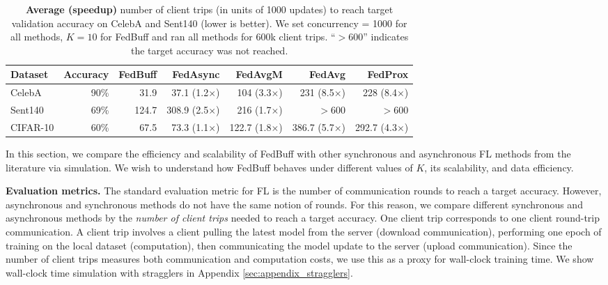 \documentclass[twoside]{article}
\newcommand{\algname}{{FedBuff}\xspace}
\begin{document}
\begin{table}
\centering
\caption{\textbf{Average (speedup)} number of client trips (in units of 1000 updates) to reach target validation accuracy on CelebA and Sent140 (lower is better). We set concurrency = 1000 for all methods, $K=10$ for FedBuff and ran all methods for 600k client trips. ``$>600$'' indicates the target accuracy was not reached.}
\label{tab:baseline_convergence}
\begin{tabular}{lrrrrrr} 
\toprule
Dataset &  Accuracy &   FedBuff    & FedAsync       & FedAvgM    & FedAvg     & FedProx     \\ 
\midrule
CelebA  & 90\%              & 31.9  & 37.1 (1.2$\times$)    & 104 (3.3$\times$) & 231 (8.5$\times$) & 228 (8.4$\times$)  \\
Sent140 & 69\%             & 124.7 & 308.9 (2.5$\times$) & 216 (1.7$\times$) & $>600$   & $ >600$    \\
CIFAR-10 & 60\%             & 67.5 & 73.3 (1.1$\times$) & 122.7 (1.8$\times$) & 386.7 (5.7$\times$) &  292.7 (4.3$\times$)    \\
\bottomrule
\end{tabular}
\end{table}

In this section, we compare the efficiency and scalability of \algname{} with other synchronous and asynchronous FL methods from the literature via simulation. We wish to understand how \algname{} behaves under different values of $K$, its scalability, and data efficiency.  

\textbf{Evaluation metrics.}
The standard evaluation metric for FL is the number of communication rounds to reach a target accuracy. However, asynchronous and synchronous methods do not have the same notion of rounds. For this reason, we compare different synchronous and asynchronous methods by the \emph{number of client trips} needed to reach a target accuracy. 
One client trip corresponds to one client round-trip communication. A client trip involves a client pulling the latest model from the server (download communication), performing one epoch of training on the local dataset (computation), then communicating the model update to the server (upload communication). Since the number of client trips measures both communication and computation costs, we use this as a proxy for wall-clock training time. We show wall-clock time simulation with stragglers in Appendix \ref{sec:appendix_stragglers}. 
\end{document}

